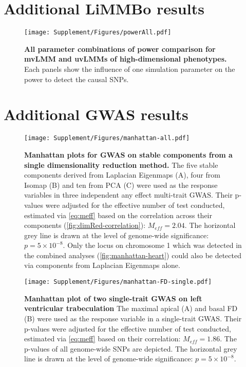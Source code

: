 \newpage
\chapter{Additional LiMMBo results}
\begin{figure}[hbtp]
	\centering
	\texttt{[image: Supplement/Figures/powerAll.pdf]}
		\caption[\textbf{All parameter combinations of power comparison for mvLMM and uvLMMs of high-dimensional phenotypes.}]{\textbf{All parameter combinations of power comparison for mvLMM and uvLMMs of high-dimensional phenotypes.} Each panels show the influence of one simulation parameter on the power to detect the causal SNPs.} 
	 	\label{fig:power-all}
\end{figure}


\newpage
\chapter{Additional GWAS results}
\begin{figure}[hbtp]
	\centering
	\texttt{[image: Supplement/Figures/manhattan-all.pdf]}
	\caption[\textbf{Manhattan plots for GWAS on stable components from a single dimensionality reduction method. }]{\textbf{Manhattan plots for GWAS on stable components from a single dimensionality reduction method. }The five stable components derived from Laplacian Eigenmaps (A), four from Isomap (B) and ten from PCA (C) were used as the response variables in three independent any effect multi-trait GWAS. Their p-values were adjusted for the effective number of test conducted, estimated via \cref{eq:meff} based on the correlation across their components (\cref{fig:dimRed-correlation}): \(M_{eff}=2.04\). The horizontal grey line is drawn at the level of genome-wide significance: \(p = 5 \times 10^{-8}\). Only the locus on chromosome 1 which was detected in the combined analyses (\cref{fig:manhattan-heart}) could also be detected via components from Laplacian Eigenmaps alone. } 
	 	\label{fig:manhattan-3Dheart-single}
\end{figure}


\begin{figure}[hbtp]
	\centering
	\texttt{[image: Supplement/Figures/manhattan-FD-single.pdf]}
	\caption[\textbf{Manhattan plot of  two single-trait GWAS on left ventricular trabeculation. }]{\textbf{Manhattan plot of two single-trait GWAS on left ventricular trabeculation } The maximal apical (A) and basal FD (B) were used as the response variable in a single-trait GWAS.  Their p-values were adjusted for the effective number of test conducted, estimated via \cref{eq:meff} based on their correlation: \(M_{eff}=1.86\). The p-values of all genome-wide SNPs are depicted. The horizontal grey line is drawn at the level of genome-wide significance: \(p = 5 \times 10^{-8}\).} 
	 	\label{fig:manhattan-FD-single}
\end{figure}